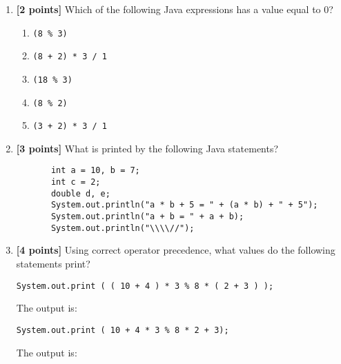 \documentclass[11pt]{report}
\begin{document}
\begin{enumerate}
\bigskip

\item {\bf [2 points]}
Which of the following Java expressions has a value equal to 0?
\begin{enumerate}
  \item {\tt (8 \% 3)}
  \item {\tt (8 + 2) * 3 / 1}
  \item {\tt (18 \% 3)}
  \item {\tt (8 \% 2)}
  \item {\tt (3 + 2) * 3 / 1}
\end{enumerate}

\bigskip


\item {\bf [3 points]}
What is printed by the following Java statements? 
\begin{verbatim}
       int a = 10, b = 7;
       int c = 2;
       double d, e;
       System.out.println("a * b + 5 = " + (a * b) + " + 5");
       System.out.println("a + b = " + a + b);
       System.out.println("\\\\//");
\end{verbatim}
\vspace{1.0in}

\newpage
\item {\bf [4 points]}
Using correct operator precedence, what values do the following statements print?

\begin{verbatim}
System.out.print ( ( 10 + 4 ) * 3 % 8 * ( 2 + 3 ) ); 		
\end{verbatim}

\vspace*{-.175in}
The output is: \mbox{\underline{\hspace{3in}}}

\begin{verbatim}
System.out.print ( 10 + 4 * 3 % 8 * 2 + 3);				    
\end{verbatim}	

\vspace*{-.175in}
The output is: \mbox{\underline{\hspace{3in}}}

\medskip



\end{enumerate}
\end{document}
